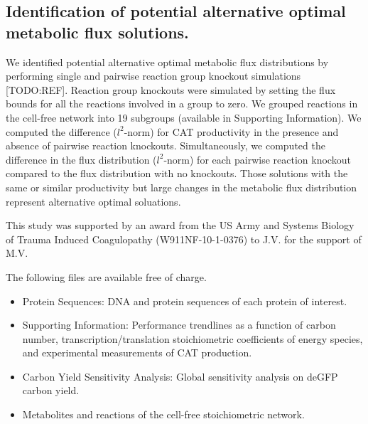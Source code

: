 \documentclass[journal=asbcd6,manuscript=article]{achemso}
\begin{document}
\subsection*{Identification of potential alternative optimal metabolic flux solutions.}
We identified potential alternative optimal metabolic flux distributions by performing single and pairwise reaction group knockout simulations [TODO:REF].
Reaction group knockouts were simulated by setting the flux bounds for all the reactions involved in a group to zero.
We grouped reactions in the cell-free network into 19 subgroups (available in Supporting Information).
We computed the difference ($l^{2}$-norm) for CAT productivity in the presence and absence of pairwise reaction knockouts.
Simultaneously, we computed the difference in the flux distribution ($l^{2}$-norm) for each pairwise reaction knockout compared to the flux distribution with no knockouts.
Those solutions with the same or similar productivity but large changes in the metabolic flux distribution represent alternative optimal soluations.

\begin{acknowledgement}

This study was supported by an award from the US Army and Systems Biology of Trauma Induced Coagulopathy (W911NF-10-1-0376) to J.V. for the support of M.V.

\end{acknowledgement}

\begin{suppinfo}
The following files are available free of charge.
\begin{itemize}
  \item Protein Sequences: DNA and protein sequences of each protein of interest.
  \item Supporting Information: Performance trendlines as a function of carbon number, transcription/translation stoichiometric coefficients of energy species, and experimental measurements of CAT production.
  \item Carbon Yield Sensitivity Analysis: Global sensitivity analysis on deGFP carbon yield.
  \item Metabolites and reactions of the cell-free stoichiometric network.
\end{itemize}
\end{suppinfo}
\end{document}
